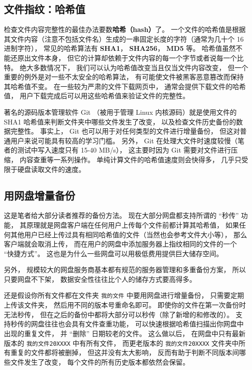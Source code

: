 \subsection{文件指纹：哈希值}
检查文件内容完整性的最佳办法要数\textbf{哈希（hash）}了。 一个文件的哈希值是根据其文件内容（注意不包括文件名）生成的一串固定长度的字符（通常为几十个 16 进制字符）， 常见的哈希算法有 \textbf{SHA1}， \textbf{SHA256}， \textbf{MD5} 等。 哈希值虽然不能还原出文件本身， 但它的计算却依赖于文件内容的每一个字节或者说每一个比特。 绝大多数情况下， 我们可以认为哈希值改变当且仅当文件内容改变， 但一个重要的例外是对一些不太安全的哈希算法， 有可能使文件被黑客恶意篡改而保持其哈希值不变。 在一些较为严肃的文件下载网页中， 通常会提供下载文件的哈希值， 用户下载完成后可以用这些哈希值来验证文件的完整性。

著名的源码版本管理软件 Git （被用于管理 Linux 内核源码）就是使用文件的 SHA1 哈希值来判断文件夹中哪些文件发生了改变， 以及检查文件历史备份的数据完整性。 事实上， Git 也可以用于对任何类型的文件进行增量备份， 但这对普通用户来说可能具有较高的学习门槛。 另外， Git 在处理大文件时速度较慢（笔者的测试中写入速度只有 15-40 MB/s）， 这主要时因为 Git 需要对文件进行压缩， 内容查重等一系列操作。 单纯计算文件的哈希值速度则会快得多， 几乎只受限于硬盘读取文件的速度。

\subsection{用网盘增量备份}
这是笔者给大部分读者推荐的备份方法。 现在大部分网盘都支持所谓的 “秒传” 功能， 其原理就是网盘客户端在任何用户上传每个文件前都计算其哈希值， 如果任何其他用户已经上传过具有相同哈希值的文件（当然也会参考文件大小等）， 那么客户端就会取消上传， 而在用户的网盘中添加服务器上指纹相同的文件的一个 “快捷方式”。 这也是为什么一些网盘可以用极低费用提供巨大储存空间。

另外， 规模较大的网盘服务商基本都有规范的服务器管理和多重备份方案， 所以只要网盘不下架， 数据安全性往往比个人的储存方式要高得多。

还是假设你所有文件都在文件夹 \verb|我的文件| 中要用网盘进行增量备份， 只需要定期上传该文件夹， 然后用不同的版本号重命名即可。 即使你的文件在第一次备份时无法秒传， 但在之后的备份中都将大部分可以秒传（除了新增的和修改的）。 支持秒传的网盘往往也会具有文件查重功能， 可以快速根据哈希值扫描出你网盘中出现的重复文件， 并 “删除” 日期较老的文件。 这么做以后， 在网盘中只有最新版本的 \verb|我的文件20XXXX| 中有所有文件， 而更老版本的 \verb|我的文件20XXXX| 文件夹中所有重复的文件都将被删掉， 但这并没有太大影响， 反而有助于判断不同版本间哪些文件发生了改变， 每个文件的所有历史版本都依然会保留。

